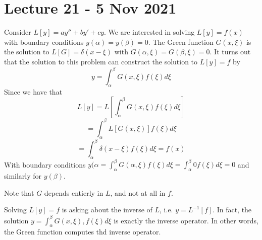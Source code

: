 \section{Lecture 21 - 5 Nov 2021}
Consider $L[y]=ay''+by'+cy$. We are interested in solving $L[y]=f(x)$ with boundary
conditions $y(\alpha)=y(\beta)=0$. The Green function $G(x,\xi)$ is the solution to
$L[G]=\delta(x-\xi)$ with $G(\alpha,\xi)=G(\beta, \xi)=0$. It turns out that the
solution to this problem can construct the solution to $L[y]=f$ by
\[y= \int_{\alpha}^{\beta}G(x,\xi) f(\xi) d\xi\]
Since we have that 
\[L[y]=L[\int_{\alpha}^{\beta}G(x,\xi) f(\xi) d\xi]\]
\[= \int_{\alpha}^{\beta}L[G(x,\xi)] f(\xi) d\xi\]
\[= \int_{\alpha}^{\beta}\delta(x-\xi) f(\xi) d\xi= f(x)\]
With boundary conditions $y(\alpha=\int_{\alpha}^{\beta}G(\alpha,\xi)f(\xi)d\xi =
\int_{\alpha}^{\beta} 0 f(\xi)d\xi =0$ and similarly for $y(\beta)$. 
\begin{remark}
  Note that $G$ depends entierly in $L$, and not at all in $f$.
\end{remark}
\begin{remark}
  Solving $L[y]=f$ is asking about the inverse of $L$, i.e. $y=L^{-1}[f]$. In fact, the
  solution $y=\int_{\alpha}^{\beta} G(x,\xi), f(\xi) d\xi$ is exactly the inverse
  operator. In other words, the Green function computes thd inverse operator.
\end{remark}


